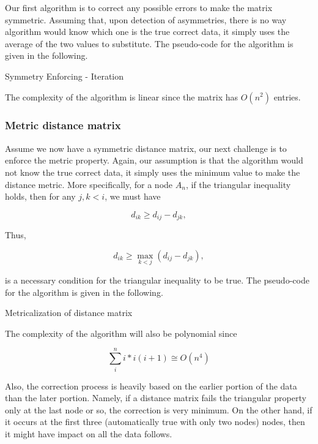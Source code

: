 Our first algorithm is to correct any possible errors to 
make the matrix symmetric. Assuming that, upon detection 
of asymmetries, there is no way algorithm would know which 
one is the true correct data, it simply uses the average 
of the two values to substitute. The pseudo-code for the 
algorithm is given in the following. 


\begin{algorithm}[H]
\SetAlgoRefName{}	
\caption{Symmetry Enforcing - Iteration}
\end{algorithm}

The complexity of the algorithm is linear since the matrix 
has $O(n^2)$ entries.

\subsubsection{Metric distance matrix}
Assume we now have a symmetric distance matrix, our next 
challenge is to enforce the metric property. Again, 
our assumption is that the algorithm would not know the 
true correct data, it simply uses the minimum value to make 
the distance metric. More specifically, for a node $A_n$, 
if the triangular inequality holds, then for any $j,k < i$, 
we must have

\[
d_{ik} \geq d_{ij} - d_{jk},
\]

Thus,

\[
d_{ik} \geq \max_{k<j}(d_{ij} - d_{jk}),
\]

is a necessary condition for the triangular inequality to be true. 
The pseudo-code for the algorithm is given in the following.

\begin{algorithm}[H]
\SetAlgoRefName{}	
\caption{Metricalization of distance matrix}
\end{algorithm}

The complexity of the algorithm will also be polynomial since

\[
\sum_i^n i*i(i+1) \cong O(n^4)
\]

Also, the correction process is heavily based on the earlier 
portion of the data than the later portion. Namely, if a 
distance matrix fails the triangular property only at the 
last node or so, the correction is very minimum. 
On the other hand, if it occurs at the first three 
(automatically true with only two nodes) nodes, then it 
might have impact on all the data follows.



\newpage